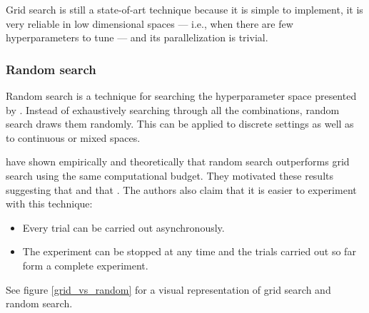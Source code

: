                 Grid search is still a state-of-art technique because it is simple to implement, it is very reliable in low dimensional spaces --- i.e., when there are few hyperparameters to tune --- and its parallelization is trivial.
            \subsubsection{Random search}
                Random search is a technique for searching the hyperparameter space presented by \citeauthor{Bergstra} \cite{Bergstra}. Instead of exhaustively searching through all the combinations, random search draws them randomly. This can be applied to discrete settings as well as to continuous or mixed spaces.
                
                
                
                \citeauthor{Bergstra} have shown empirically and theoretically that random search outperforms grid search using the same computational budget. They motivated these results suggesting that  and that . The authors also claim that it is easier to experiment with this technique:
                \begin{itemize}
                    \item Every trial can be carried out asynchronously.
                    \item The experiment can be stopped at any time and the trials carried out so far form a complete experiment.
                \end{itemize}
                See figure \ref{grid_vs_random} for a visual representation of grid search and random search.